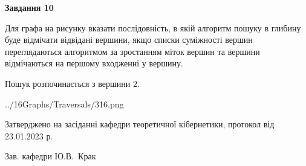 \documentclass[12pt, ukrainian]{article}
\begin{document}
{\begin {large}
{\begin {center}\textbf{Завдання 10}\end {center}}\par
Для графа на рисунку вказати послідовність, в якій алгоритм пошуку в глибину буде відмічати відвідані вершини, якщо списки суміжності вершин переглядаються алгоритмом за зростанням міток вершин та вершини відмічаються на першому вход\-женні у вершину.\par
Пошук розпочинається з вершини 2.\par

\begin{center}
	{../16Graphs/Traversals/316.png}
\end{center}\par
\newpage


\end {large}
}
{\smallskip \begin {small} Затверджено на засіданні кафедри теоретичної кібернетики, протокол  від   23.01.2023 р.\par\smallskip\smallskip
{\parbox {6.5 cm}{Зав. кафедри \dotfill Ю.В.~Крак}} \end{small}}
\end{document}
